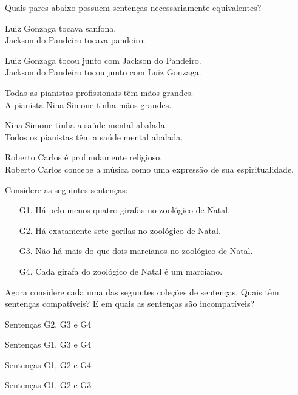 \problempart Quais pares abaixo possuem sentenças necessariamente equivalentes?

\begin{earg}
\item Luiz Gonzaga tocava sanfona. \\
	Jackson do Pandeiro tocava pandeiro.

\item Luiz Gonzaga tocou junto com Jackson do Pandeiro. \\
	Jackson do Pandeiro tocou junto com Luiz Gonzaga.

\item Todas  as pianistas profissionais têm mãos grandes. \\
	A pianista Nina Simone tinha mãos grandes.

\item Nina Simone tinha a saúde mental abalada. \\
	Todos os pianistas têm a saúde mental abalada.

\item Roberto Carlos é profundamente religioso. \\
	Roberto Carlos concebe a música como uma expressão de sua espiritualidade.
\end{earg}


\noindent \problempart Considere as seguintes sentenças: 
\begin{enumerate}%
\item[G1.] \label{itm:at_least_four} Há pelo menos quatro girafas no zoológico de Natal.
\item[G2.] \label{itm:exactly_seven} Há exatamente sete gorilas no zoológico de Natal.
\item[G3.] \label{itm:not_more_than_two} Não há mais do que dois marcianos no zoológico de Natal.
\item[G4.] \label{itm:martians} Cada girafa do zoológico de Natal é um marciano.
\end{enumerate}

Agora considere cada uma das seguintes coleções de sentenças. Quais têm sentenças compatíveis? E em quais as sentenças são incompatíveis?
\begin{earg}
\item Sentenças G2, G3 e G4
\item Sentenças G1, G3 e G4
\item Sentenças G1, G2 e G4
\item Sentenças G1, G2 e G3
\end{earg}

